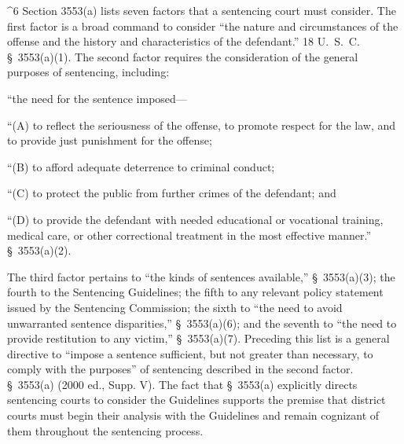 ^6 Section 3553(a) lists seven factors that a sentencing court must
consider. The first factor is a broad command to consider ``the nature
and circumstances of the offense and the history and characteristics of
the defendant.'' 18 U.~S.~C. \S~3553(a)(1). The second factor
requires the consideration of the general purposes of sentencing,
including:

  ``the need for the sentence imposed---

  ``(A) to reflect the seriousness of the offense, to promote respect
for the law, and to provide just punishment for the offense;

  ``(B) to afford adequate deterrence to criminal conduct;

  ``(C) to protect the public from further crimes of the defendant; and

  ``(D) to provide the defendant with needed educational or vocational
training, medical care, or other correctional treatment in the most
effective manner.'' \S~3553(a)(2).

  The third factor pertains to ``the kinds of sentences available,''
\S~3553(a)(3); the fourth to the Sentencing Guidelines; the
fifth to any relevant policy statement issued by the Sentencing
Commission; the sixth to ``the need to avoid unwarranted sentence
disparities,'' \S~3553(a)(6); and the seventh to ``the need to
provide restitution to any victim,'' \S~3553(a)(7). Preceding this
list is a general directive to ``impose a sentence sufficient, but not
greater than necessary, to comply with the purposes'' of sentencing
described in the second factor. \S~3553(a) (2000 ed., Supp. V).
The fact that \S~3553(a) explicitly directs sentencing courts to
consider the Guidelines supports the premise that district courts must
begin their analysis with the Guidelines and remain cognizant of them
throughout the sentencing process.\newpage 

